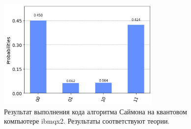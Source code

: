 \documentclass{mrl}
\begin{document}
\break 
\begin{figure}
    \centering
    \includegraphics[width=8cm]{simons11.png}
    \caption{Результат выполнения кода алгоритма Саймона на квантовом компьютере ibmqx2. Результаты соответствуют теории.}
    \label{fig:simons_output}
\end{figure}

{}

\end{document}
